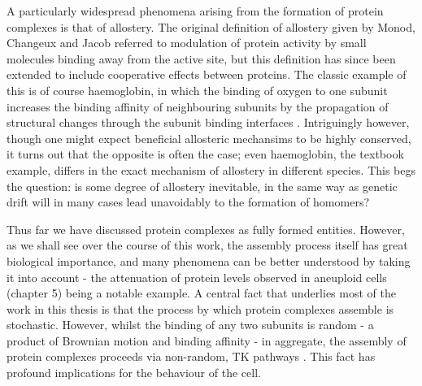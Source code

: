 \documentclass[a4paper,11pt,twoside,openright]{scrbook}
\begin{document}
A particularly widespread phenomena arising from the formation of protein complexes is that of allostery. The original definition of allostery given by Monod, Changeux and Jacob \cite{Monod1963} referred to modulation of protein activity by small molecules binding away from the active site, but this definition has since been extended to include cooperative effects between proteins. The classic example of this is of course haemoglobin, in which the binding of oxygen to one subunit increases the binding affinity of neighbouring subunits by the propagation of structural changes through the subunit binding interfaces \cite{Perutz1976}. Intriguingly however, though one might expect beneficial allosteric mechansims to be highly conserved, it turns out that the opposite is often the case; even haemoglobin, the textbook example, differs in the exact mechanism of allostery in different species. This begs the question: is some degree of allostery inevitable, in the same way as genetic drift will in many cases lead unavoidably to the formation of homomers?

Thus far we have discussed protein complexes as fully formed entities. However, as we shall see over the course of this work, the assembly process itself has great biological importance, and many phenomena can be better understood by taking it into account - the attenuation of protein levels observed in aneuploid cells (chapter 5) being a notable example. A central fact that underlies most of the work in this thesis is that the process by which protein complexes assemble is stochastic. However, whilst the binding of any two subunits is random - a product of Brownian motion and binding affinity - in aggregate, the assembly of protein complexes proceeds via non-random, TK pathways \cite{Levy2008a, Marsh2013, Macek2017}. This fact has profound implications for the behaviour of the cell.

\end{document}
